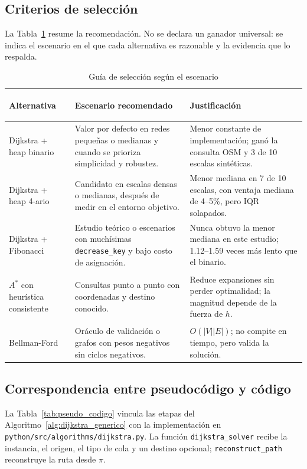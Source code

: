 \subsection{Criterios de selección}
La Tabla~\ref{tab:guia_seleccion} resume la recomendación. No se declara un ganador universal: se indica el escenario en el que cada alternativa es razonable y la evidencia que lo respalda.

\begin{table}[H]
    \centering
    \fontsize{9}{11}\selectfont
    \renewcommand{\arraystretch}{1.15}
    \caption{Guía de selección según el escenario}
    \label{tab:guia_seleccion}
    \begin{tabularx}{\textwidth}{@{}>{\bfseries\raggedright\arraybackslash}p{3.3cm} >{\raggedright\arraybackslash}p{4.2cm} >{\raggedright\arraybackslash}X@{}}
        \toprule
        \textbf{Alternativa} & \textbf{Escenario recomendado} & \textbf{Justificación} \\
        \midrule
        Dijkstra + heap binario & Valor por defecto en redes pequeñas o medianas y cuando se prioriza simplicidad y robustez. & Menor constante de implementación; ganó la consulta OSM y 3 de 10 escalas sintéticas. \\
        Dijkstra + heap 4-ario & Candidato en escalas densas o medianas, después de medir en el entorno objetivo. & Menor mediana en 7 de 10 escalas, con ventaja mediana de 4--5\%, pero IQR solapados. \\
        Dijkstra + Fibonacci & Estudio teórico o escenarios con muchísimas \texttt{decrease\_key} y bajo costo de asignación. & Nunca obtuvo la menor mediana en este estudio; 1.12--1.59 veces más lento que el binario. \\
        $A^*$ con heurística consistente & Consultas punto a punto con coordenadas y destino conocido. & Reduce expansiones sin perder optimalidad; la magnitud depende de la fuerza de $h$. \\
        Bellman-Ford & Oráculo de validación o grafos con pesos negativos sin ciclos negativos. & $O(|V||E|)$; no compite en tiempo, pero valida la solución. \\
        \bottomrule
    \end{tabularx}
\end{table}

\subsection{Correspondencia entre pseudocódigo y código}
La Tabla~\ref{tab:pseudo_codigo} vincula las etapas del Algoritmo~\ref{alg:dijkstra_generico} con la implementación en \texttt{python/src/algorithms/dijkstra.py}. La función \texttt{dijkstra\_solver} recibe la instancia, el origen, el tipo de cola y un destino opcional; \texttt{reconstruct\_path} reconstruye la ruta desde $\pi$.

